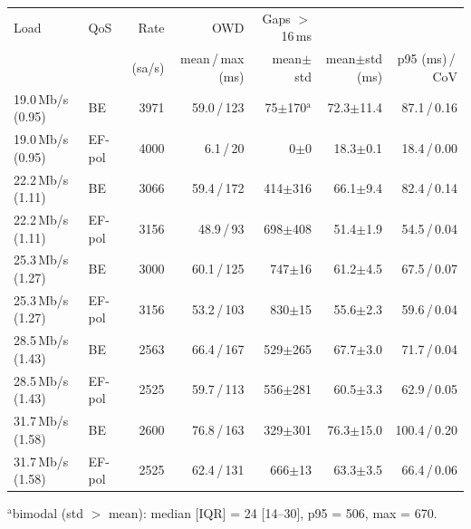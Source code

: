 \begin{tabular}{llrrrrr}
\toprule
Load & QoS & Rate & OWD & Gaps $>$16\,ms & \ttrip{} & \ttrip{} \\
 & & (sa/s) & mean\,/\,max (ms) & mean$\pm$std & mean$\pm$std (ms) & p95 (ms)\,/\,CoV \\
\midrule
19.0\,Mb/s (0.95) & BE & 3971 & 59.0\,/\,123 & 75$\pm$170$^{\mathrm{a}}$ & 72.3$\pm$11.4 & 87.1\,/\,0.16 \\
19.0\,Mb/s (0.95) & EF-pol & 4000 & 6.1\,/\,20 & 0$\pm$0 & 18.3$\pm$0.1 & 18.4\,/\,0.00 \\
22.2\,Mb/s (1.11) & BE & 3066 & 59.4\,/\,172 & 414$\pm$316 & 66.1$\pm$9.4 & 82.4\,/\,0.14 \\
22.2\,Mb/s (1.11) & EF-pol & 3156 & 48.9\,/\,93 & 698$\pm$408 & 51.4$\pm$1.9 & 54.5\,/\,0.04 \\
25.3\,Mb/s (1.27) & BE & 3000 & 60.1\,/\,125 & 747$\pm$16 & 61.2$\pm$4.5 & 67.5\,/\,0.07 \\
25.3\,Mb/s (1.27) & EF-pol & 3156 & 53.2\,/\,103 & 830$\pm$15 & 55.6$\pm$2.3 & 59.6\,/\,0.04 \\
28.5\,Mb/s (1.43) & BE & 2563 & 66.4\,/\,167 & 529$\pm$265 & 67.7$\pm$3.0 & 71.7\,/\,0.04 \\
28.5\,Mb/s (1.43) & EF-pol & 2525 & 59.7\,/\,113 & 556$\pm$281 & 60.5$\pm$3.3 & 62.9\,/\,0.05 \\
31.7\,Mb/s (1.58) & BE & 2600 & 76.8\,/\,163 & 329$\pm$301 & 76.3$\pm$15.0 & 100.4\,/\,0.20 \\
31.7\,Mb/s (1.58) & EF-pol & 2525 & 62.4\,/\,131 & 666$\pm$13 & 63.3$\pm$3.5 & 66.4\,/\,0.06 \\
\bottomrule
\end{tabular}
\par\smallskip\footnotesize $^{\mathrm{a}}$bimodal (std $>$ mean): median [IQR] = 24 [14--30], p95 = 506, max = 670.
